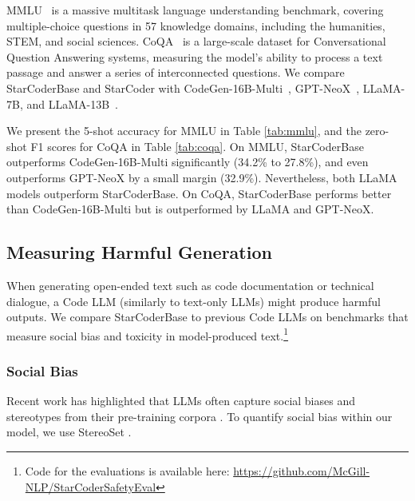 MMLU~\citep{hendrycks2020mmlu} is a massive multitask language understanding benchmark, covering multiple-choice questions in 57 knowledge domains, including the humanities, STEM, and social sciences. CoQA~\citep{reddy2019coqa} is a large-scale dataset for Conversational Question Answering systems, measuring the model's ability to process a text passage and answer a series of interconnected questions. We compare StarCoderBase and StarCoder with CodeGen-16B-Multi~\citep{nijkamp:codegen}, GPT-NeoX~\citep{black2022gpt}, LLaMA-7B, and LLaMA-13B~\citep{touvron2023llama}. 

We present the 5-shot accuracy for MMLU in Table \ref{tab:mmlu}, and the zero-shot F1 scores for CoQA in Table \ref{tab:coqa}. On MMLU, StarCoderBase outperforms CodeGen-16B-Multi significantly (34.2\% to 27.8\%), and even outperforms GPT-NeoX by a small margin (32.9\%). Nevertheless, both LLaMA models outperform StarCoderBase. On CoQA, StarCoderBase performs better than CodeGen-16B-Multi  but is outperformed by LLaMA and GPT-NeoX.

\subsection{Measuring Harmful Generation}
\label{sec:harmful_generations}
When generating open-ended text such as code documentation or technical dialogue, a Code LLM (similarly to text-only LLMs) might produce harmful outputs. We compare StarCoderBase to previous Code LLMs on benchmarks that measure social bias and toxicity in model-produced text.\footnote{Code for the evaluations is available here: \url{https://github.com/McGill-NLP/StarCoderSafetyEval}}

\subsubsection{Social Bias}\label{sec:social_bias}

Recent work has highlighted that LLMs often capture social biases and stereotypes from their pre-training corpora \citep{kurita_measuring_2019,may_measuring_2019,hutchinson_social_2020,meade_using_2023}. To quantify social bias within our model, we use StereoSet \citep{nadeem_stereoset_2021}.

